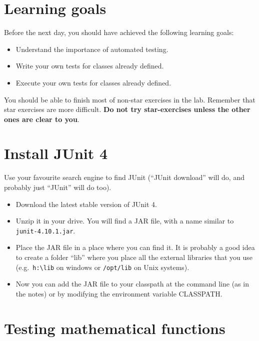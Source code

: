 \documentclass{article}
\begin{document}
\section*{Learning goals}
\label{sec:learning-goals}

Before the next day, you should have achieved the following learning
goals: 

\begin{itemize}
\item Understand the importance of automated testing. 
\item Write your own tests for classes already defined. 
\item Execute your own tests for classes already defined. 
\end{itemize}

You should be able to finish most of non-star exercises in the lab. 
Remember that star exercises are more difficult. 
\textbf{Do not try star-exercises unless the other ones are clear to
  you}.  


\section{Install JUnit 4}
\label{sec:install-junit-4}

Use your favourite search engine to find JUnit (``JUnit download''
will do, and probably just ``JUnit'' will do too). 

\begin{itemize}
\item Download the latest stable version of JUnit 4.
\item Unzip it in your drive. You will find a JAR file, with a name
  similar to \verb+junit-4.10.1.jar+.
\item Place the JAR file in a place where you can find it. It is
  probably a good idea to create a folder ``lib'' where you place all
  the external libraries that you use (e.g.~\verb+h:\lib+ on windows
  or \verb+/opt/lib+ on Unix systems).
\item Now you can add the JAR file to your classpath at the command
  line (as in the notes) or by modifying the environment variable
  CLASSPATH. 
\end{itemize}

\section{Testing mathematical functions}
\label{sec:test-math-funct}
\end{document}
